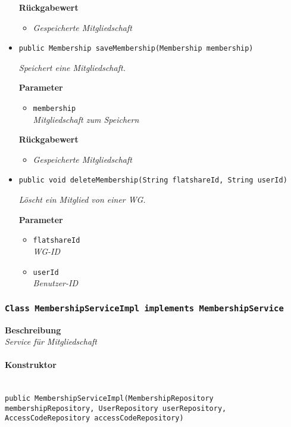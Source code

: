 \begin{itemize}
     	\textbf{Rückgabewert}
     	\begin{itemize}
     		\item\textit{Gespeicherte Mitgliedschaft}
     	\end{itemize}
     
     \item{\texttt{public Membership saveMembership(Membership membership)}}
     	
     	\textit{Speichert eine Mitgliedschaft.}
     	
     	\textbf{Parameter}
     	\begin{itemize}
     		\item\texttt{membership}\\
     		\textit{Mitgliedschaft zum Speichern}
     	\end{itemize}
     
     	\textbf{Rückgabewert}
     	\begin{itemize}
     		\item\textit{Gespeicherte Mitgliedschaft}
     	\end{itemize}
     
     \item{\texttt{public void deleteMembership(String flatshareId, String userId)}}
     	
     	\textit{Löscht ein Mitglied von einer WG.}
     	
     	\textbf{Parameter}
     	\begin{itemize}
     		\item\texttt{flatshareId}\\
     		\textit{WG-ID}
     		\item\texttt{userId}\\
     		\textit{Benutzer-ID}
     	\end{itemize}
     \end{itemize}
     
     \subsubsection{\texttt{Class MembershipServiceImpl implements MembershipService}}
     \textbf{Beschreibung} \\
     \textit{Service für Mitgliedschaft}
     \paragraph*{Konstruktor}\mbox{} \\
     \texttt{public MembershipServiceImpl(MembershipRepository membershipRepository, UserRepository userRepository, AccessCodeRepository accessCodeRepository)}
